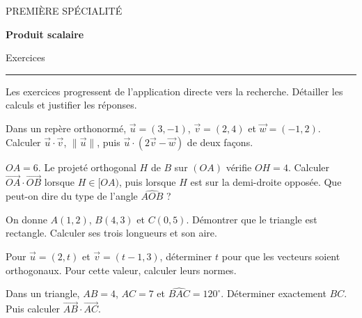 \documentclass[11pt,a4paper]{article}
\begin{document}
{\small\color{Blue}PREMIÈRE SPÉCIALITÉ}\par{\LARGE\bfseries Produit scalaire}\par{\large Exercices}\par\vspace{0.2cm}\hrule\vspace{0.4cm}
Les exercices progressent de l’application directe vers la recherche. Détailler les calculs et justifier les réponses.
\par\noindent\begin{minipage}{\linewidth}
Dans un repère orthonormé, $\vec u=(3,-1)$, $\vec v=(2,4)$ et $\vec w=(-1,2)$. Calculer $\vec u\cdot\vec v$, $\|\vec u\|$, puis $\vec u\cdot(2\vec v-\vec w)$ de deux façons.
\end{minipage}\par
\par\noindent\begin{minipage}{\linewidth}
$OA=6$. Le projeté orthogonal $H$ de $B$ sur $(OA)$ vérifie $OH=4$. Calculer $\overrightarrow{OA}\cdot\overrightarrow{OB}$ lorsque $H\in[OA)$, puis lorsque $H$ est sur la demi-droite opposée. Que peut-on dire du type de l’angle $\widehat{AOB}$ ?
\end{minipage}\par
\par\noindent\begin{minipage}{\linewidth}
On donne $A(1,2)$, $B(4,3)$ et $C(0,5)$. Démontrer que le triangle est rectangle. Calculer ses trois longueurs et son aire.
\end{minipage}\par
\par\noindent\begin{minipage}{\linewidth}
Pour $\vec u=(2,t)$ et $\vec v=(t-1,3)$, déterminer $t$ pour que les vecteurs soient orthogonaux. Pour cette valeur, calculer leurs normes.
\end{minipage}\par
\par\noindent\begin{minipage}{\linewidth}
Dans un triangle, $AB=4$, $AC=7$ et $\widehat{BAC}=120^\circ$. Déterminer exactement $BC$. Puis calculer $\overrightarrow{AB}\cdot\overrightarrow{AC}$.
\end{minipage}\par
\end{document}
